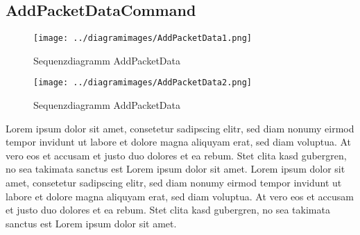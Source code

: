 \subsection{AddPacketDataCommand}
\begin{sidewaysfigure}
  \centering
  \texttt{[image: ../diagramimages/AddPacketData1.png]}
  \caption[Sequenzdiagramm AddPacketData]{Sequenzdiagramm AddPacketData}
\end{sidewaysfigure}

\begin{sidewaysfigure}
  \centering
  \texttt{[image: ../diagramimages/AddPacketData2.png]}
  \caption[Sequenzdiagramm AddPacketData]{Sequenzdiagramm AddPacketData}
\end{sidewaysfigure}

Lorem ipsum dolor sit amet, consetetur sadipscing elitr, sed diam nonumy eirmod tempor invidunt ut labore et dolore magna aliquyam erat, sed diam voluptua. At vero eos et accusam et justo duo dolores et ea rebum. Stet clita kasd gubergren, no sea takimata sanctus est Lorem ipsum dolor sit amet. Lorem ipsum dolor sit amet, consetetur sadipscing elitr, sed diam nonumy eirmod tempor invidunt ut labore et dolore magna aliquyam erat, sed diam voluptua. At vero eos et accusam et justo duo dolores et ea rebum. Stet clita kasd gubergren, no sea takimata sanctus est Lorem ipsum dolor sit amet.